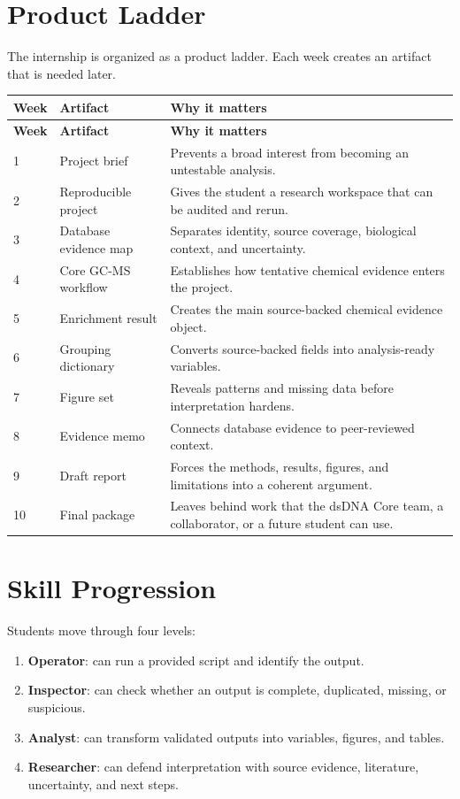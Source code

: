 \section{Product Ladder}
The internship is organized as a product ladder. Each week creates an artifact that is needed later.

\begin{longtable}{p{}p{}p{}}
\toprule
\textbf{Week} & \textbf{Artifact} & \textbf{Why it matters}\\
\midrule
\endfirsthead
\toprule
\textbf{Week} & \textbf{Artifact} & \textbf{Why it matters}\\
\midrule
\endhead
1 & Project brief & Prevents a broad interest from becoming an untestable analysis.\\
2 & Reproducible project & Gives the student a research workspace that can be audited and rerun.\\
3 & Database evidence map & Separates identity, source coverage, biological context, and uncertainty.\\
4 & Core GC-MS workflow & Establishes how tentative chemical evidence enters the project.\\
5 & Enrichment result & Creates the main source-backed chemical evidence object.\\
6 & Grouping dictionary & Converts source-backed fields into analysis-ready variables.\\
7 & Figure set & Reveals patterns and missing data before interpretation hardens.\\
8 & Evidence memo & Connects database evidence to peer-reviewed context.\\
9 & Draft report & Forces the methods, results, figures, and limitations into a coherent argument.\\
10 & Final package & Leaves behind work that the dsDNA Core team, a collaborator, or a future student can use.\\
\bottomrule
\end{longtable}

\section{Skill Progression}
Students move through four levels:

\begin{enumerate}
  \item \textbf{Operator}: can run a provided script and identify the output.
  \item \textbf{Inspector}: can check whether an output is complete, duplicated, missing, or suspicious.
  \item \textbf{Analyst}: can transform validated outputs into variables, figures, and tables.
  \item \textbf{Researcher}: can defend interpretation with source evidence, literature, uncertainty, and next steps.
\end{enumerate}

